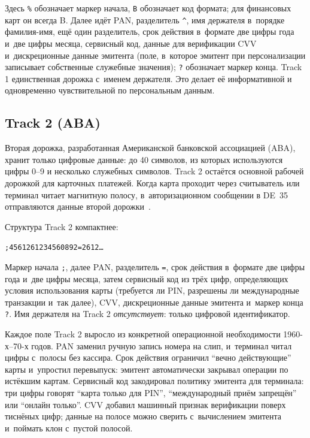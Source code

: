 Здесь \texttt{\%} обозначает маркер начала, \texttt{B} обозначает код формата;
для финансовых карт он всегда B. Далее идёт PAN, разделитель
\texttt{\^{}}, имя держателя в~порядке фамилия-имя, ещё один разделитель,
срок действия в~формате две цифры года и~две цифры месяца, сервисный код,
данные для верификации CVV
и~дискреционные данные эмитента (поле, в~которое эмитент при
персонализации записывает собственные служебные значения);
\texttt{?} обозначает маркер конца.
Track 1 единственная дорожка с~именем держателя. Это делает её
информативной и одновременно чувствительной по
персональным данным.

\subsection*{Track 2 (ABA)}

Вторая дорожка, разработанная Американской банковской ассоциацией
(ABA), хранит только цифровые данные: до 40 символов, из которых
используются цифры 0--9 и несколько служебных символов. Track 2
остаётся основной рабочей дорожкой для карточных платежей. Когда
карта проходит через считыватель или терминал читает магнитную
полосу, в~авторизационном сообщении в DE~35 отправляются данные
второй дорожки~\cite{visa-tadg}.

Структура Track 2 компактнее:

\begin{center}
  \texttt{;4561261234560892=2612\ldots}
\end{center}

Маркер начала \texttt{;}, далее PAN, разделитель \texttt{=},
срок действия в~формате две цифры года и~две цифры месяца, затем
сервисный код из трёх цифр, определяющих условия использования
карты (требуется ли PIN, разрешены ли международные транзакции
и~так далее), CVV, дискреционные данные эмитента
и~маркер конца \texttt{?}. Имя держателя на Track 2
\emph{отсутствует}: только цифровой идентификатор.

Каждое поле Track 2 выросло из конкретной операционной необходимости
1960-х--70-х годов. PAN заменил ручную запись номера на слип, и~терминал
читал цифры с~полосы без кассира. Срок действия ограничил
\enquote{вечно действующие} карты и~упростил перевыпуск: эмитент
автоматически закрывал операции по истёкшим картам. Сервисный код
закодировал политику эмитента для терминала: три цифры говорят
\enquote{карта только для PIN}, \enquote{международный приём запрещён}
или \enquote{онлайн только}. CVV добавил машинный признак
верификации поверх тиснёных цифр; данные на полосе можно сверить
с~вычислением эмитента и~поймать клон с~пустой полосой.

